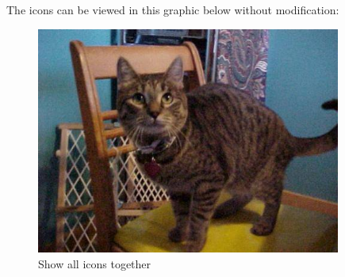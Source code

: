The icons can be viewed in this graphic below without modification:

\begin{figure}[htb]
	\centering
	\includegraphics[width=10cm]{./Images/cats_00001.jpg}
	\caption{Show all icons together}
	\label{fig:DBOperations}
\end{figure}
